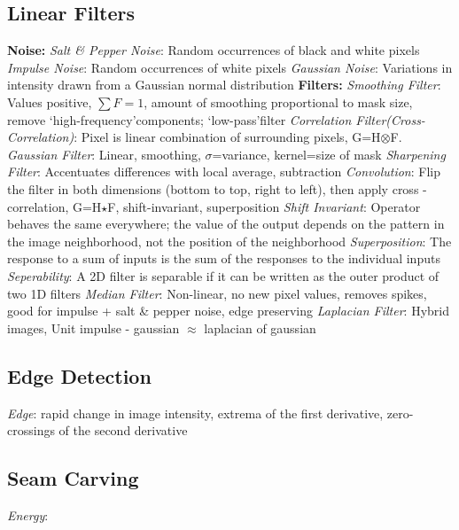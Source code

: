 \documentclass{article}
\author{Ian Chen}
\date{\today}
\begin{document}
    \begin{multicols*}{2}
        \subsection*{Linear Filters}
        \textbf{Noise:}\newline
        \textit{Salt \& Pepper Noise}: Random occurrences of black and white pixels\newline
        \textit{Impulse Noise}: Random occurrences of white pixels\newline
        \textit{Gaussian Noise}: Variations in intensity drawn from a Gaussian normal distribution\newline
        \textbf{Filters:}\newline
        \textit{Smoothing Filter}: Values positive, $\sum F=1$, amount of smoothing proportional to mask size, remove
        \textquoteleft high-frequency\textquoteright components; \textquoteleft low-pass\textquoteright filter\newline
        \textit{Correlation Filter(Cross-Correlation)}: Pixel is linear combination of surrounding pixels,
        G=H$\otimes$F.\newline
        \textit{Gaussian Filter}: Linear, smoothing, $\sigma$=variance, kernel=size of mask\newline
        \textit{Sharpening Filter}: Accentuates differences with local average, subtraction\newline
        \textit{Convolution}: Flip the filter in both dimensions (bottom to top, right to left), then apply cross
        -correlation, G=H$\star$F, shift-invariant, superposition\newline
        \textit{Shift Invariant}: Operator behaves the same everywhere; the value of the output depends on the
        pattern in the image neighborhood, not the position of the neighborhood\newline
        \textit{Superposition}: The response to a sum of inputs is the sum of the responses to the individual inputs\newline
        \textit{Seperability}: A 2D filter is separable if it can be written as the outer product of two 1D filters\newline
        \textit{Median Filter}: Non-linear, no new pixel values, removes spikes, good for impulse + salt \& pepper
        noise, edge preserving\newline
        \textit{Laplacian Filter}: Hybrid images, Unit impulse - gaussian $\approx$ laplacian of gaussian\newline
        \subsection*{Edge Detection}
        \textit{Edge}: rapid change in image intensity, extrema of the first derivative, zero-crossings of the second
        derivative\newline
        \subsection*{Seam Carving}
        \textit{Energy}:
    \end{multicols*}
\end{document}
